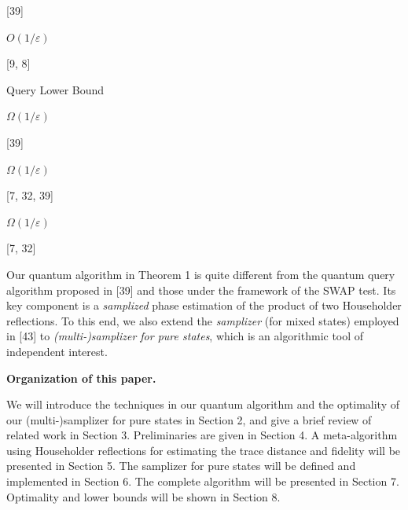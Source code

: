 \documentclass[10pt,a4paper]{article}
\begin{document}
[39] 
\par



 




$O(1/\varepsilon)$ 
\par


[9, 8] 
\par



 
\par


Query Lower Bound 




$\Omega(1/\varepsilon)$ 
\par


[39] 
\par



 




$\Omega(1/\varepsilon)$ 
\par


[7, 32, 39] 
\par



 




$\Omega(1/\varepsilon)$ 
\par


[7, 32] 
\par



 
\par







Our quantum algorithm in Theorem 1 is quite different from the quantum query algorithm proposed in [39] and those under the framework of the SWAP test. Its key component is a \emph{samplized} phase estimation of the product of two Householder reflections.
To this end, we also extend the \emph{samplizer} (for mixed states) employed in [43] to \emph{(multi-)samplizer for pure states}, which is an algorithmic tool of independent interest.\par




\par\medskip\noindent\textbf{Organization of this paper.}\par




We will introduce the techniques in our quantum algorithm and the optimality of our (multi-)samplizer for pure states in Section 2, and give a brief review of related work in Section 3.
Preliminaries are given in Section 4.
A meta-algorithm using Householder reflections for estimating the trace distance and fidelity will be presented in Section 5.
The samplizer for pure states will be defined and implemented in Section 6.
The complete algorithm will be presented in Section 7.
Optimality and lower bounds will be shown in Section 8.\par
\end{document}
